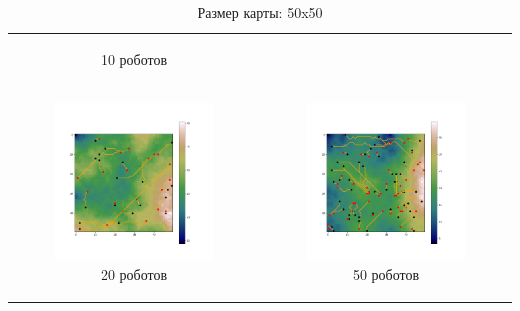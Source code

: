 \documentclass{article}
\begin{document}
\begin{table}[H]
\begin{tabular}{c c}
\begin{subfigure}{0.5\linewidth}
			\caption*{10 роботов}
			\end{subfigure}
			\\
            \begin{subfigure}{0.5\linewidth}
				\includegraphics[width = 1.0\columnwidth]{data/mean_paths/50x50/20.png}
			\caption*{20 роботов}
			\end{subfigure}
			&
			\begin{subfigure}{0.5\linewidth}
				\includegraphics[width = 1.0\columnwidth]{data/mean_paths/50x50/50.png}
			\caption*{50 роботов}
			\end{subfigure}
        \end{tabular}
        \caption*{Размер карты: 50x50}
	\end{table}
\end{document}
